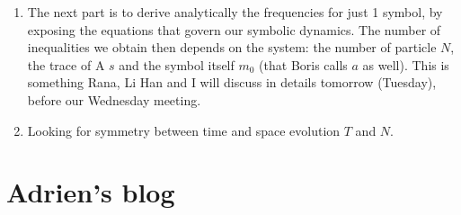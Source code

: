 \begin{enumerate}
\item
The next part is to derive analytically the frequencies for just 1 symbol, by exposing the equations that govern our symbolic dynamics. The number of inequalities we obtain then depends on the system: the number of particle $N$, the trace of A $s$ and the symbol itself $m_0$ (that Boris calls $a$ as well). This is something Rana, Li Han and I will discuss in details tomorrow (Tuesday), before our Wednesday meeting.

\item
Looking for symmetry between time and space evolution $T$ and $N$.


\end{enumerate}










\newpage

\section{Adrien's blog}
\label{sect:blogAKS}

